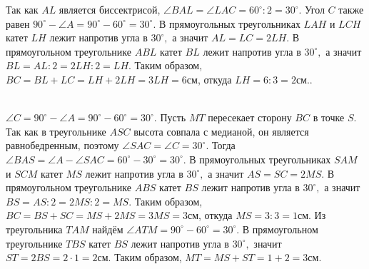 \documentclass[12pt]{article}
\begin{document}
Так как $AL$ является биссектрисой, $\angle BAL=\angle LAC=60^\circ:2=30^\circ.$ Угол $C$ также равен $90^\circ-\angle A=90^\circ-60^\circ=30^\circ.$ В прямоугольных треугольниках $LAH$ и $LCH$ катет $LH$ лежит напротив угла в $30^\circ,$ а значит $AL=LC=2LH.$ В прямоугольном треугольнике $ABL$ катет $BL$ лежит напротив угла
в $30^\circ,$ а значит $BL=AL:2=2LH:2=LH.$ Таким образом, $BC=BL+LC=LH+2LH=3LH=6$см, откуда $LH=6:3=2$см.\newpage{}. \begin{figure}[ht!]
\end{figure}\\
$\angle C=90^\circ-\angle A=90^\circ-60^\circ=30^\circ.$ Пусть $MT$ пересекает сторону $BC$ в точке $S.$ Так как в треугольнике $ASC$ высота совпала с медианой, он является равнобедренным, поэтому $\angle SAC=\angle C=30^\circ.$ Тогда $\angle BAS=\angle A-\angle SAC=60^\circ-30^\circ=30^\circ.$ В прямоугольных треугольниках $SAM$ и $SCM$ катет $MS$ лежит напротив угла в $30^\circ,$ а значит $AS=SC=2MS.$ В прямоугольном треугольнике $ABS$ катет $BS$ лежит напротив угла
в $30^\circ,$ а значит $BS=AS:2=2MS:2=MS.$ Таким образом, $BC=BS+SC=MS+2MS=3MS=3$см, откуда $MS=3:3=1$см. Из треугольника $TAM$ найдём $\angle ATM=90^\circ-60^\circ=30^\circ.$ В прямоугольном треугольнике $TBS$ катет $BS$ лежит напротив угла в $30^\circ,$ значит $ST=2BS=2\cdot1=2$см. Таким образом, $MT=MS+ST=1+2=3$см.\\
\end{document}
